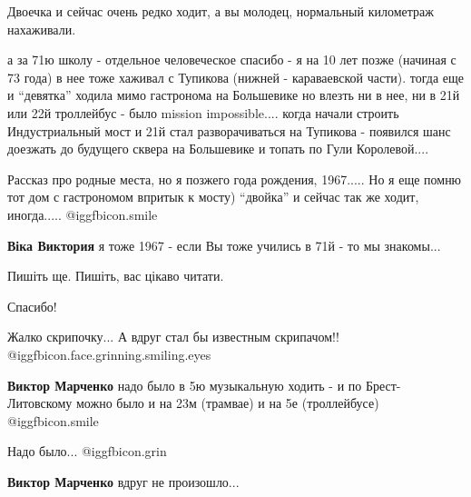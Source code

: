  
 
 
 
 
\zzSecCmt

\begin{itemize} %
Двоечка и сейчас очень редко ходит, а вы молодец, нормальный километраж нахаживали.


а за 71ю школу - отдельное человеческое спасибо - я на 10 лет позже (начиная с
73 года) в нее тоже хаживал с Тупикова (нижней - караваевской части). тогда еще
и \enquote{девятка} ходила мимо гастронома на Большевике но влезть ни в нее, ни в 21й
или 22й троллейбус - было mission impossible.... когда начали строить
Индустриальный мост и 21й стал разворачиваться на Тупикова - появился шанс
доезжать до будущего сквера на Большевике и топать по Гули Королевой....


Рассказ про родные места, но я позжего года рождения, 1967..... Но я еще помню
тот дом с гастрономом впритык к мосту) \enquote{двойка} и сейчас так же ходит,
иногда.....  @igg{fbicon.smile} 


\textbf{Віка Виктория} я тоже 1967 - если Вы тоже учились в 71й - то мы знакомы...

Пишіть ще. Пишіть, вас цікаво читати.


Спасибо!


Жалко скрипочку... А вдруг стал бы известным скрипачом!!
@igg{fbicon.face.grinning.smiling.eyes} 

\begin{itemize} %
\textbf{Виктор Марченко} надо было в 5ю музыкальную ходить - и по Брест-Литовскому можно было и на 23м (трамвае) и на 5е (троллейбусе)  @igg{fbicon.smile} 

Надо было... @igg{fbicon.grin} 

\textbf{Виктор Марченко} вдруг не произошло...
\end{itemize} %


\end{itemize}
